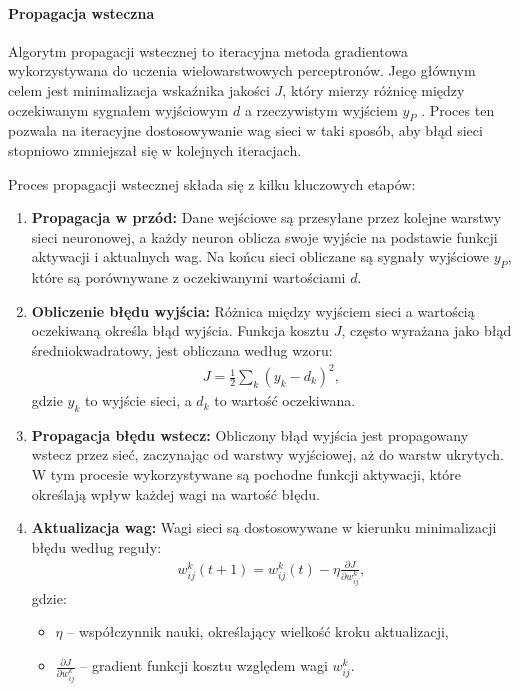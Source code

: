 \documentclass[a4paper,twoside,12pt]{book}
\begin{document}
\paragraph{Propagacja wsteczna}
Algorytm propagacji wstecznej  to iteracyjna metoda gradientowa wykorzystywana do uczenia wielowarstwowych perceptronów. Jego głównym celem jest minimalizacja wskaźnika jakości \( J \), który mierzy różnicę między oczekiwanym sygnałem wyjściowym \( d \) a rzeczywistym wyjściem \( y_P \) \cite{bib:fujarewicz}. Proces ten pozwala na iteracyjne dostosowywanie wag sieci w taki sposób, aby błąd sieci stopniowo zmniejszał się w kolejnych iteracjach.

Proces propagacji wstecznej składa się z kilku kluczowych etapów:
\begin{enumerate}
    \item \textbf{Propagacja w przód:} Dane wejściowe są przesyłane przez kolejne warstwy sieci neuronowej, a każdy neuron oblicza swoje wyjście na podstawie funkcji aktywacji i aktualnych wag. Na końcu sieci obliczane są sygnały wyjściowe \( y_P \), które są porównywane z oczekiwanymi wartościami \( d \).
    
    \item \textbf{Obliczenie błędu wyjścia:} Różnica między wyjściem sieci a wartością oczekiwaną określa błąd wyjścia. Funkcja kosztu \( J \), często wyrażana jako błąd średniokwadratowy, jest obliczana według wzoru:
    \begin{align}
        J = \frac{1}{2} \sum_{k} (y_k - d_k)^2,
    \end{align}
    gdzie \( y_k \) to wyjście sieci, a \( d_k \) to wartość oczekiwana.

    \item \textbf{Propagacja błędu wstecz:} Obliczony błąd wyjścia jest propagowany wstecz przez sieć, zaczynając od warstwy wyjściowej, aż do warstw ukrytych. W tym procesie wykorzystywane są pochodne funkcji aktywacji, które określają wpływ każdej wagi na wartość błędu.

    \item \textbf{Aktualizacja wag:} Wagi sieci są dostosowywane w kierunku minimalizacji błędu według reguły:
    \begin{align}
        w_{ij}^k(t+1) = w_{ij}^k(t) - \eta \frac{\partial J}{\partial w_{ij}^k},
    \end{align}
    gdzie:
    \begin{itemize}
        \item \( \eta \) – współczynnik nauki, określający wielkość kroku aktualizacji,
        \item \( \frac{\partial J}{\partial w_{ij}^k} \) – gradient funkcji kosztu względem wagi \( w_{ij}^k \).
    \end{itemize}
\end{enumerate}
\end{document}
